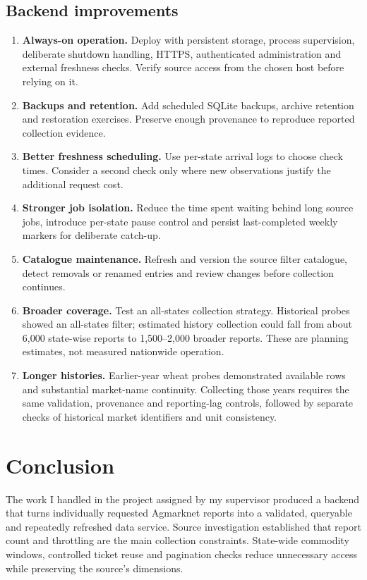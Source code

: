 \documentclass[12pt,a4paper,oneside]{report}
\numberwithin{equation}{chapter}
\numberwithin{figure}{chapter}
\numberwithin{table}{chapter}
\theoremstyle{definition}
\begin{document}
\section{Backend improvements}
\begin{enumerate}
  \item \textbf{Always-on operation.} Deploy with persistent storage, process supervision, deliberate shutdown handling, HTTPS, authenticated administration and external freshness checks. Verify source access from the chosen host before relying on it.
  \item \textbf{Backups and retention.} Add scheduled SQLite backups, archive retention and restoration exercises. Preserve enough provenance to reproduce reported collection evidence.
  \item \textbf{Better freshness scheduling.} Use per-state arrival logs to choose check times. Consider a second check only where new observations justify the additional request cost.
  \item \textbf{Stronger job isolation.} Reduce the time spent waiting behind long source jobs, introduce per-state pause control and persist last-completed weekly markers for deliberate catch-up.
  \item \textbf{Catalogue maintenance.} Refresh and version the source filter catalogue, detect removals or renamed entries and review changes before collection continues.
  \item \textbf{Broader coverage.} Test an all-states collection strategy. Historical probes showed an all-states filter; estimated history collection could fall from about 6,000 state-wise reports to 1,500--2,000 broader reports. These are planning estimates, not measured nationwide operation.
  \item \textbf{Longer histories.} Earlier-year wheat probes demonstrated available rows and substantial market-name continuity. Collecting those years requires the same validation, provenance and reporting-lag controls, followed by separate checks of historical market identifiers and unit consistency.
\end{enumerate}

\chapter{Conclusion}
The work I handled in the project assigned by my supervisor produced a backend that turns individually requested Agmarknet reports into a validated, queryable and repeatedly refreshed data service. Source investigation established that report count and throttling are the main collection constraints. State-wide commodity windows, controlled ticket reuse and pagination checks reduce unnecessary access while preserving the source's dimensions.
\end{document}
